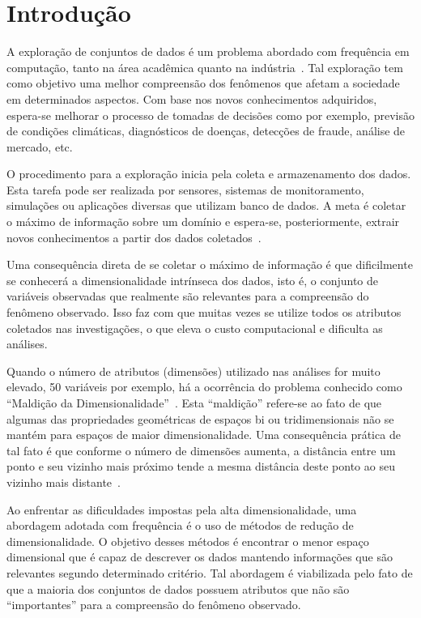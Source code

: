\section{Introdução}

A exploração de conjuntos de dados é um problema abordado com frequência em computação, tanto na área acadêmica quanto na indústria~\cite{Ngai2009,Harding2006}. Tal exploração tem como objetivo uma melhor compreensão dos fenômenos que afetam a sociedade em determinados aspectos. Com base nos novos conhecimentos adquiridos, espera-se melhorar o processo de tomadas de decisões como por exemplo, previsão de condições climáticas, diagnósticos de doenças, detecções de fraude, análise de mercado, etc.

O procedimento para a exploração inicia pela coleta e armazenamento dos dados. Esta tarefa pode ser realizada por sensores, sistemas de monitoramento, simulações ou aplicações diversas que utilizam banco de dados. A meta é coletar o máximo de informação sobre um domínio e espera-se, posteriormente, extrair novos conhecimentos a partir dos dados coletados~\cite{Keim2002}. 

Uma consequência direta de se coletar o máximo de informação é que dificilmente se conhecerá a dimensionalidade intrínseca dos dados, isto é, o conjunto de variáveis observadas que realmente são relevantes para a compreensão do fenômeno observado. Isso faz com que muitas vezes se utilize todos os atributos coletados nas investigações, o que eleva o custo computacional e dificulta as análises. 

Quando o número de atributos (dimensões) utilizado nas análises for muito elevado, 50 variáveis por exemplo, há a ocorrência do problema conhecido como ``Maldição da Dimensionalidade''~\cite{Beyer1999}. Esta ``maldição'' refere-se ao fato de que algumas das propriedades geométricas de espaços bi ou tridimensionais não se mantém para espaços de maior dimensionalidade. Uma consequência prática de tal fato é que conforme o número de  dimensões aumenta, a distância entre um ponto e seu vizinho mais próximo tende a mesma distância deste ponto ao seu vizinho mais distante~\citet{Beyer1999}.

Ao enfrentar as dificuldades impostas pela alta dimensionalidade, uma abordagem adotada com frequência é o uso de métodos de redução de dimensionalidade. O objetivo desses métodos é encontrar o menor espaço dimensional que é capaz de descrever os dados mantendo informações que são relevantes segundo determinado critério. Tal abordagem é  viabilizada pelo fato de que a maioria dos conjuntos de dados possuem atributos que não são ``importantes'' para a compreensão do fenômeno observado.

